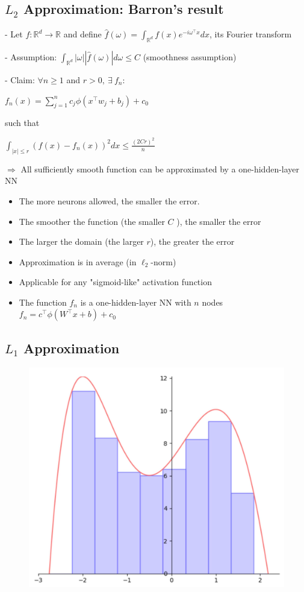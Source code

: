 \subsection*{$L_{2}$ Approximation: Barron's result}
- Let $f: \mathbb{R}^{d} \rightarrow \mathbb{R}$ and define $\hat{f}(\omega)=\int_{\mathbb{R}^{d}} f(x) e^{-i \omega^{\top} x} d x$, its Fourier transform

- Assumption: $\int_{\mathbb{R}^{d}}|\omega||\hat{f}(\omega)| d \omega \leq C$ (smoothness assumption)

- Claim: $\forall n \geq 1$ and $r>0, \ \exists \ f_{n}$:

$
f_{n}(x)=\sum_{j=1}^{n} c_{j} \phi\left(x^{\top} w_{j}+b_{j}\right)+c_{0}
$

such that

$
\int_{|x| \leq r}\left(f(x)-f_{n}(x)\right)^{2} d x \leq \frac{(2 C r)^{2}}{n}
$

$\Rightarrow$ All sufficiently smooth function can be approximated by a one-hidden-layer NN

\begin{itemize}
  \item The more neurons allowed, the smaller the error.
  \item The smoother the function (the smaller $C$ ), the smaller the error
  \item The larger the domain (the larger $r$), the greater the error
  \item Approximation is in average (in $\ell_{2}$-norm)
  \item Applicable for any "sigmoid-like" activation function
  \item The function $f_{n}$ is a one-hidden-layer $\mathrm{NN}$ with $n$ nodes $f_n =c^{\top} \phi\left(W^{\top} x+b\right)+c_{0}$
\end{itemize}

\subsection*{$L_{1}$ Approximation}

\begin{figure} 
  \centering
  \includegraphics[width=0.4\columnwidth]{figures/nn3.jpg}
  \vspace{-10pt}
\end{figure}

